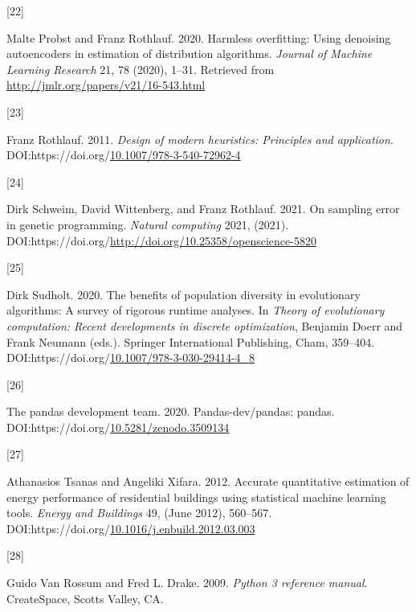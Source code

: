 \documentclass[
  11pt,
]{article}
\newlength{\cslhangindent}
\newlength{\csllabelwidth}
\newlength{\cslentryspacingunit} %
\newenvironment{CSLReferences}[2] %
 {%
  \setlength{\parindent}{0pt}
  \ifodd #1
  \let\oldpar\par
  \def\par{\hangindent=\cslhangindent\oldpar}
  \fi
  \setlength{\parskip}{#2\cslentryspacingunit}
 }%
 {}
\newcommand{\CSLLeftMargin}[1]{\parbox[t]{\csllabelwidth}{#1}}
\newcommand{\CSLRightInline}[1]{\parbox[t]{\linewidth - \csllabelwidth}{#1}\break}
\begin{document}
\begin{CSLReferences}{0}{0}
\leavevmode{}%
\CSLLeftMargin{{[}22{]} }%
\CSLRightInline{Malte Probst and Franz Rothlauf. 2020. Harmless overfitting: Using denoising autoencoders in estimation of distribution algorithms. \emph{Journal of Machine Learning Research} 21, 78 (2020), 1--31. Retrieved from \url{http://jmlr.org/papers/v21/16-543.html}}

\leavevmode{}%
\CSLLeftMargin{{[}23{]} }%
\CSLRightInline{Franz Rothlauf. 2011. \emph{Design of modern heuristics: Principles and application}. DOI:https://doi.org/\href{https://doi.org/10.1007/978-3-540-72962-4}{10.1007/978-3-540-72962-4}}

\leavevmode{}%
\CSLLeftMargin{{[}24{]} }%
\CSLRightInline{Dirk Schweim, David Wittenberg, and Franz Rothlauf. 2021. On sampling error in genetic programming. \emph{Natural computing} 2021, (2021). DOI:https://doi.org/\url{http://doi.org/10.25358/openscience-5820}}

\leavevmode{}%
\CSLLeftMargin{{[}25{]} }%
\CSLRightInline{Dirk Sudholt. 2020. The benefits of population diversity in evolutionary algorithms: A survey of rigorous runtime analyses. In \emph{Theory of evolutionary computation: Recent developments in discrete optimization}, Benjamin Doerr and Frank Neumann (eds.). Springer International Publishing, Cham, 359--404. DOI:https://doi.org/\href{https://doi.org/10.1007/978-3-030-29414-4_8}{10.1007/978-3-030-29414-4\_8}}

\leavevmode{}%
\CSLLeftMargin{{[}26{]} }%
\CSLRightInline{The pandas development team. 2020. Pandas-dev/pandas: pandas. DOI:https://doi.org/\href{https://doi.org/10.5281/zenodo.3509134}{10.5281/zenodo.3509134}}

\leavevmode{}%
\CSLLeftMargin{{[}27{]} }%
\CSLRightInline{Athanasios Tsanas and Angeliki Xifara. 2012. Accurate quantitative estimation of energy performance of residential buildings using statistical machine learning tools. \emph{Energy and Buildings} 49, (June 2012), 560--567. DOI:https://doi.org/\href{https://doi.org/10.1016/j.enbuild.2012.03.003}{10.1016/j.enbuild.2012.03.003}}

\leavevmode{}%
\CSLLeftMargin{{[}28{]} }%
\CSLRightInline{Guido Van Rossum and Fred L. Drake. 2009. \emph{Python 3 reference manual}. CreateSpace, Scotts Valley, CA.}


\end{CSLReferences}
\end{document}
